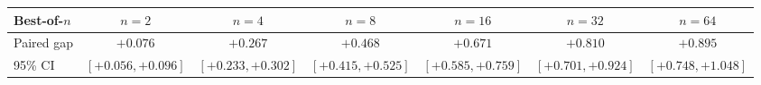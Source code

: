 \begin{tabular}{lcccccc}
\toprule
Best-of-$n$ & $n{=}2$ & $n{=}4$ & $n{=}8$ & $n{=}16$ & $n{=}32$ & $n{=}64$ \\
\midrule
Paired gap & $+0.076$ & $+0.267$ & $+0.468$ & $+0.671$ & $+0.810$ & $+0.895$ \\
95\% CI & {\scriptsize$[+0.056,+0.096]$} & {\scriptsize$[+0.233,+0.302]$} & {\scriptsize$[+0.415,+0.525]$} & {\scriptsize$[+0.585,+0.759]$} & {\scriptsize$[+0.701,+0.924]$} & {\scriptsize$[+0.748,+1.048]$} \\
\bottomrule
\end{tabular}
